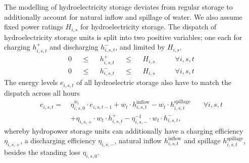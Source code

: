 The modelling of hydroelectricity storage deviates from regular storage to
additionally account for natural inflow and spillage of water. We also assume
fixed power ratings $H_{i,s}$ for hydroelectricity storage. The dispatch of
hydroelectricity storage units is split into two positive variables; one each
for charging $h_{i,s,t}^+$ and discharging $h_{i,s,t}^-$, and limited by
$H_{i,s}$.
\begin{align}
  0 &  & \leq &  & h_{i,s,t}^+ &  & \leq &  & H_{i,s} & \qquad\forall i, s, t \label{eq:sto1} \\
  0 &  & \leq &  & h_{i,s,t}^- &  & \leq &  & H_{i,s} & \qquad\forall i, s, t \label{eq:sto2}
\end{align}
The energy levels $e_{i,s,t}$ of all hydroelectric storage also have to match
the dispatch across all hours
\begin{align}
  e_{i,s,t} =\: & \eta_{i,s,0}^{w_t} \cdot e_{i,s,t-1} + w_t \cdot h_{i,s,t}^\text{inflow} - w_t \cdot h_{i,s,t}^\text{spillage} & \quad\forall i, s, t \nonumber \\
                & + \eta_{i,s,+} \cdot w_t \cdot h_{i,s,t}^+ - \eta_{i,s,-}^{-1} \cdot w_t \cdot h_{i,s,t}^-, \label{eq:stoe-2}
\end{align}
whereby hydropower storage units can additionally have a charging efficiency
$\eta_{i,s,+}$, a discharging efficiency $\eta_{i,s,-}$, natural inflow
$h_{i,s,t}^\text{inflow}$ and spillage $h_{i,s,t}^\text{spillage}$, besides the
standing loss $\eta_{i,s,0}$.

